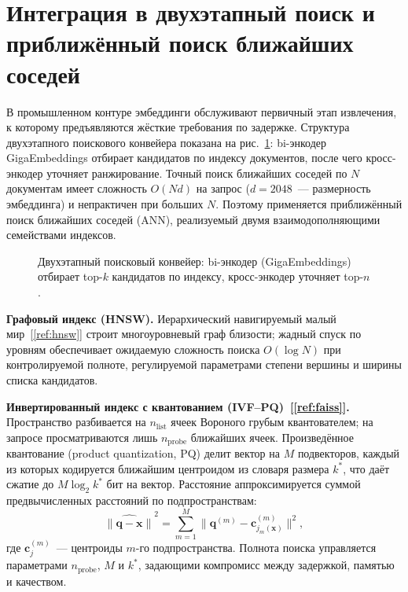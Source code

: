 \documentclass[12pt,a4paper]{article}
\begin{document}
\section{Интеграция в двухэтапный поиск и приближённый поиск
ближайших соседей}\label{sec:ann}
В промышленном контуре эмбеддинги обслуживают первичный этап извлечения, к
которому предъявляются жёсткие требования по задержке. Структура двухэтапного
поискового конвейера показана на рис.~\ref{fig:two-stage}: bi-энкодер
GigaEmbeddings отбирает кандидатов по индексу документов, после чего
кросс-энкодер уточняет ранжирование. Точный поиск ближайших соседей по $N$
документам имеет сложность $O(Nd)$ на запрос ($d = 2048$~--- размерность эмбеддинга) и
непрактичен при больших $N$. Поэтому применяется приближённый поиск ближайших
соседей (ANN), реализуемый двумя взаимодополняющими семействами индексов.

\begin{figure}[ht]
  \centering
  \resizebox{\textwidth}{!}{%
    }
  \caption{Двухэтапный поисковый конвейер: bi-энкодер (GigaEmbeddings) отбирает
  top-$k$ кандидатов по индексу, кросс-энкодер уточняет top-$n$.}\label{fig:two-stage}
\end{figure}

\textbf{Графовый индекс (HNSW).} Иерархический навигируемый малый
мир~[\ref{ref:hnsw}] строит многоуровневый граф близости; жадный спуск по
уровням обеспечивает ожидаемую сложность поиска $O(\log N)$ при контролируемой
полноте, регулируемой параметрами степени вершины и ширины списка кандидатов.

\textbf{Инвертированный индекс с квантованием (IVF--PQ)~[\ref{ref:faiss}].} Пространство разбивается
на $n_{\text{list}}$ ячеек Вороного грубым квантователем; на запросе
просматриваются лишь $n_{\text{probe}}$ ближайших ячеек. Произведённое
квантование (product quantization, PQ) делит вектор на $M$ подвекторов, каждый
из которых кодируется ближайшим центроидом из словаря размера $k^{*}$, что даёт
сжатие до $M\log_2 k^{*}$ бит на вектор. Расстояние аппроксимируется суммой
предвычисленных расстояний по подпространствам:
\begin{equation}\label{eq:pq}
  \widehat{\lVert \mathbf{q}-\mathbf{x}\rVert}^{2}
  = \sum_{m=1}^{M} \big\lVert \mathbf{q}^{(m)} - \mathbf{c}^{(m)}_{j_m(\mathbf{x})} \big\rVert^{2},
\end{equation}
где $\mathbf{c}^{(m)}_{j}$~--- центроиды $m$-го подпространства. Полнота поиска
управляется параметрами $n_{\text{probe}}$, $M$ и $k^{*}$, задающими компромисс
между задержкой, памятью и качеством.
\end{document}
